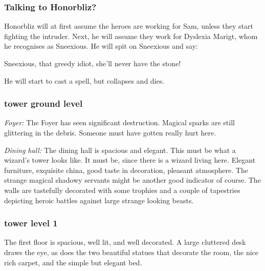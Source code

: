 \subsubsection*{Talking to Honorbliz?}
Honorbliz will at first assume the heroes are working for Sam, unless they start fighting the intruder. Next, he will assume they work for Dyslexia Marigt, whom he recognises as Sneexious. He will spit on Sneexious and say:
\begin{readoutloud}
Sneexious, that greedy idiot, she'll never have the stone!
\end{readoutloud}
He will start to cast a spell, but collapses and dies.


\subsubsection*{tower ground level}
\begin{readoutloud}
\emph{Foyer:}
The Foyer has seen significant destruction. Magical sparks are still glittering in the debris. Someone must have gotten really hurt here.
\end{readoutloud}

\begin{readoutloud}
\emph{Dining hall:}
The dining hall is spacious and elegant. This must be what a wizard's tower looks like. It must be, since there is a wizard living here. Elegant furniture, exquisite china, good taste in decoration, pleasant atmosphere. The strange magical shadowy servants might be another good indicator of course.
The walls are tastefully decorated with some trophies and a couple of tapestries depicting heroic battles against large strange looking beasts.
\end{readoutloud}


\subsubsection*{tower level 1}
\begin{readoutloud}
The first floor is spacious, well lit, and well decorated. A large cluttered desk draws the eye, as does the two beautiful statues that decorate the room, the nice rich carpet, and the simple but elegant bed.
\end{readoutloud}

